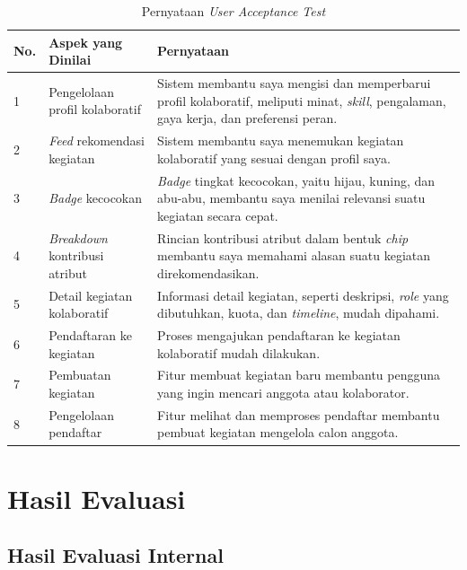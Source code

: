 \begin{table}[H]
  \caption{Pernyataan \emph{User Acceptance Test}}
  \label{tab:pernyataan-uat}
  \begin{tabularx}{\textwidth}{p{0.5cm} p{3.5cm} X}
    \toprule
    \textbf{No.} & \textbf{Aspek yang Dinilai} & \textbf{Pernyataan} \\
    \midrule
    1 & Pengelolaan profil kolaboratif & Sistem membantu saya mengisi dan memperbarui profil kolaboratif, meliputi minat, \emph{skill}, pengalaman, gaya kerja, dan preferensi peran. \\
    \midrule
    2 & \emph{Feed} rekomendasi kegiatan & Sistem membantu saya menemukan kegiatan kolaboratif yang sesuai dengan profil saya. \\
    \midrule
    3 & \emph{Badge} kecocokan & \emph{Badge} tingkat kecocokan, yaitu hijau, kuning, dan abu-abu, membantu saya menilai relevansi suatu kegiatan secara cepat. \\
    \midrule
    4 & \emph{Breakdown} kontribusi atribut & Rincian kontribusi atribut dalam bentuk \emph{chip} membantu saya memahami alasan suatu kegiatan direkomendasikan. \\
    \midrule
    5 & Detail kegiatan kolaboratif & Informasi detail kegiatan, seperti deskripsi, \emph{role} yang dibutuhkan, kuota, dan \emph{timeline}, mudah dipahami. \\
    \midrule
    6 & Pendaftaran ke kegiatan & Proses mengajukan pendaftaran ke kegiatan kolaboratif mudah dilakukan. \\
    \midrule
    7 & Pembuatan kegiatan & Fitur membuat kegiatan baru membantu pengguna yang ingin mencari anggota atau kolaborator. \\
    \midrule
    8 & Pengelolaan pendaftar & Fitur melihat dan memproses pendaftar membantu pembuat kegiatan mengelola calon anggota. \\
    \bottomrule
  \end{tabularx}
\end{table}

\section{Hasil Evaluasi}

\subsection{Hasil Evaluasi Internal}

